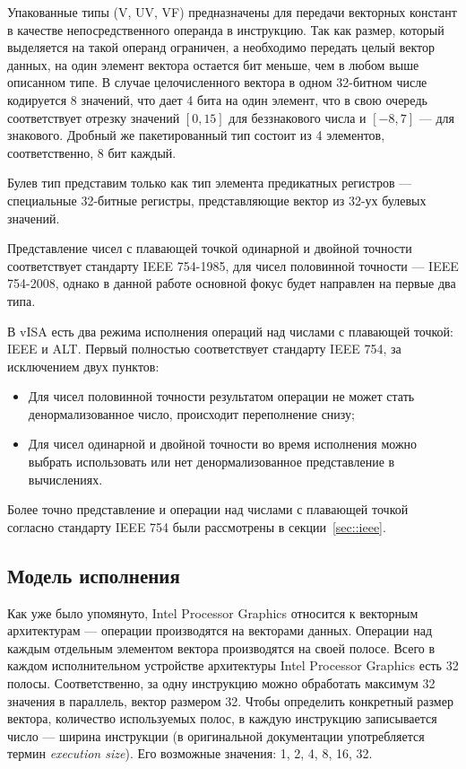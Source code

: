 Упакованные типы (V, UV, VF) предназначены для передачи векторных констант в качестве непосредственного операнда в инструкцию.
Так как размер, который выделяется на такой операнд ограничен, а необходимо передать целый вектор данных, на один элемент вектора остается бит меньше, чем в любом выше описанном типе.
В случае целочисленного вектора в одном 32-битном числе кодируется 8 значений, что дает 4 бита на один элемент, что в свою очередь соответствует отрезку значений $[0, 15]$ для беззнакового числа и $[-8, 7]$ --- для знакового.
Дробный же пакетированный тип состоит из 4 элементов, соответственно, 8 бит каждый.

Булев тип представим только как тип элемента предикатных регистров --- специальные 32-битные регистры, представляющие вектор из 32-ух булевых значений.

Представление чисел с плавающей точкой одинарной и двойной точности соответствует стандарту IEEE 754-1985\cite{ieee754}, для чисел половинной точности --- IEEE 754-2008\cite{ieee754-2008}, однако в данной работе основной фокус будет направлен на первые два типа.

В vISA есть два режима исполнения операций над числами с плавающей точкой: IEEE и ALT.
Первый полностью соответствует стандарту IEEE 754, за исключением двух пунктов:

\begin{itemize}
    \item Для чисел половинной точности результатом операции не может стать денормализованное число, происходит переполнение снизу;
    \item Для чисел одинарной и двойной точности во время исполнения можно выбрать использовать или нет денормализованное представление в вычислениях.
\end{itemize}

Более точно представление и операции над числами с плавающей точкой согласно стандарту IEEE 754 были рассмотрены в секции~\ref{sec::ieee}.

\subsection{Модель исполнения}
\label{par:visa:exec}

Как уже было упомянуто, \foreignlanguage{english}{Intel Processor Graphics} относится к векторным архитектурам --- операции производятся на векторами данных.
Операции над каждым отдельным элементом вектора производятся на своей полосе\cite[с.~271]{hennessy-patterson}.
Всего в каждом исполнительном устройстве архитектуры \foreignlanguage{english}{Intel Processor Graphics} есть 32 полосы.
Соответственно, за одну инструкцию можно обработать максимум 32 значения в параллель, вектор размером 32.
Чтобы определить конкретный размер вектора, количество используемых полос, в каждую инструкцию записывается число --- ширина инструкции (в оригинальной документации употребляется термин \foreignlanguage{english}{\textit{execution size}}).
Его возможные значения: 1, 2, 4, 8, 16, 32\cite{visa}.

